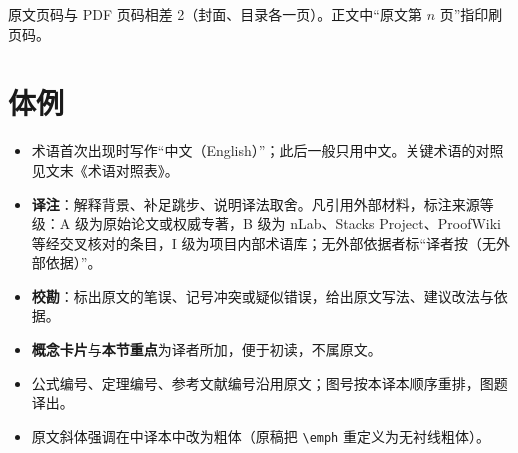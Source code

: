 原文页码与 PDF 页码相差 2（封面、目录各一页）。正文中“原文第 $n$ 页”指印刷页码。

\section*{体例}

\begin{itemize}[leftmargin=1.6em,itemsep=0.2em]
\item 术语首次出现时写作“中文（English）”；此后一般只用中文。关键术语的对照见文末《术语对照表》。
\item \textbf{译注}：解释背景、补足跳步、说明译法取舍。凡引用外部材料，标注来源等级：A 级为原始论文或权威专著，B 级为 nLab、Stacks Project、ProofWiki 等经交叉核对的条目，I 级为项目内部术语库；无外部依据者标“译者按（无外部依据）”。
\item \textbf{校勘}：标出原文的笔误、记号冲突或疑似错误，给出原文写法、建议改法与依据。
\item \textbf{概念卡片}与\textbf{本节重点}为译者所加，便于初读，不属原文。
\item 公式编号、定理编号、参考文献编号沿用原文；图号按本译本顺序重排，图题译出。
\item 原文斜体强调在中译本中改为粗体（原稿把 \verb|\emph| 重定义为无衬线粗体）。
\end{itemize}
